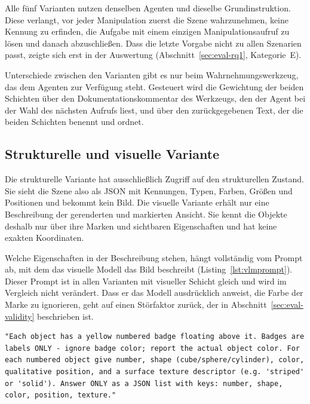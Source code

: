 Alle fünf Varianten nutzen denselben Agenten und dieselbe Grundinstruktion.
Diese verlangt, vor jeder Manipulation zuerst die Szene wahrzunehmen, keine Kennung zu erfinden, die Aufgabe mit einem einzigen Manipulationsaufruf zu lösen und danach abzuschließen.
Dass die letzte Vorgabe nicht zu allen Szenarien passt, zeigte sich erst in der Auswertung (Abschnitt~\ref{sec:eval-rq1}, Kategorie~E).

Unterschiede zwischen den Varianten gibt es nur beim Wahrnehmungswerkzeug, das dem Agenten zur Verfügung steht.
Gesteuert wird die Gewichtung der beiden Schichten über den Dokumentationskommentar des Werkzeugs, den der Agent bei der Wahl des nächsten Aufrufs liest, und über den zurückgegebenen Text, der die beiden Schichten benennt und ordnet.

\subsection*{Strukturelle und visuelle Variante}

Die strukturelle Variante hat ausschließlich Zugriff auf den strukturellen Zustand.
Sie sieht die Szene also als JSON mit Kennungen, Typen, Farben, Größen und Positionen und bekommt kein Bild.
Die visuelle Variante erhält nur eine Beschreibung der gerenderten und markierten Ansicht.
Sie kennt die Objekte deshalb nur über ihre Marken und sichtbaren Eigenschaften und hat keine exakten Koordinaten.

Welche Eigenschaften in der Beschreibung stehen, hängt vollständig vom Prompt ab, mit dem das visuelle Modell das Bild beschreibt (Listing~\ref{lst:vlmprompt}).
Dieser Prompt ist in allen Varianten mit visueller Schicht gleich und wird im Vergleich nicht verändert.
Dass er das Modell ausdrücklich anweist, die Farbe der Marke zu ignorieren, geht auf einen Störfaktor zurück, der in Abschnitt~\ref{sec:eval-validity} beschrieben ist.

\begin{listing}[htbp]
\begin{verbatim}
"Each object has a yellow numbered badge floating above it. Badges are
labels ONLY - ignore badge color; report the actual object color. For
each numbered object give number, shape (cube/sphere/cylinder), color,
qualitative position, and a surface texture descriptor (e.g. 'striped'
or 'solid'). Answer ONLY as a JSON list with keys: number, shape,
color, position, texture."
\end{verbatim}
\caption{Prompt, mit dem das visuelle Modell die gerenderte und markierte Ansicht beschreibt. Er wird zusammen mit dem Bild übergeben und ist in allen Varianten mit visueller Schicht identisch.}
\label{lst:vlmprompt}
\end{listing}

